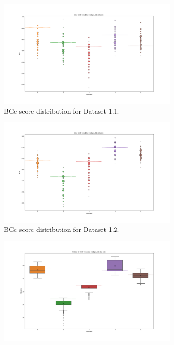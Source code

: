 \documentclass{lxaiproposal}
\begin{document}
    \begin{figure}[h]
        \centering
        \begin{subfigure}{0.48\textwidth}
            \centering
            \includegraphics[width=\textwidth]{figures/BGe_5_8_30}
            \caption{BGe score distribution for Dataset 1.1.}
            \label{subfig:bge_score_5_8_30}
        \end{subfigure}
        \begin{subfigure}{0.48\textwidth}
            \centering
            \includegraphics[width=\textwidth]{figures/BGe_5_8_50}
            \caption{BGe score distribution for Dataset 1.2.}
            \label{subfig:bge_score_5_8_50}
        \end{subfigure}
        \hfill
        \begin{subfigure}{0.48\textwidth}
            \centering
            \includegraphics[width=\textwidth]{figures/P_d_prime_5_8_30}

\end{subfigure}
\end{figure}
\end{document}
